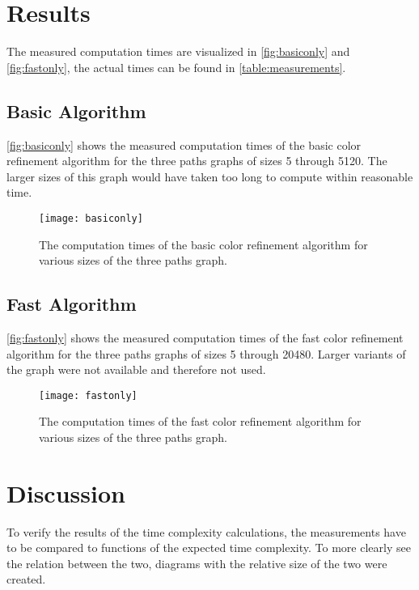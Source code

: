 \documentclass[twoside]{article}
\begin{document}
\begin{multicols}{2}
\section{Results}
\label{results}
The measured computation times are visualized in \autoref{fig:basiconly} and \autoref{fig:fastonly}, the actual times can be found in \autoref{table:measurements}.

\subsection{Basic Algorithm}
\autoref{fig:basiconly} shows the measured computation times of the basic color refinement algorithm for the three paths graphs of sizes 5 through 5120. The larger sizes of this graph would have taken too long to compute within reasonable time.

\begin{figure}[H]
	\texttt{[image: basiconly]}
	\caption{The computation times of the basic color refinement algorithm for various sizes of the three paths graph.}
	\label{fig:basiconly}
\end{figure}

\subsection{Fast Algorithm}
\autoref{fig:fastonly} shows the measured computation times of the fast color refinement algorithm for the three paths graphs of sizes 5 through 20480. Larger variants of the graph were not available and therefore not used.

\begin{figure}[H]
	\texttt{[image: fastonly]}
	\caption{The computation times of the fast color refinement algorithm for various sizes of the three paths graph.}
	\label{fig:fastonly}
\end{figure}

\section{Discussion} %
\label{disc}
To verify the results of the time complexity calculations, the measurements have to be compared to functions of the expected time complexity. To more clearly see the relation between the two, diagrams with the relative size of the two were created.


\end{multicols}
\end{document}
